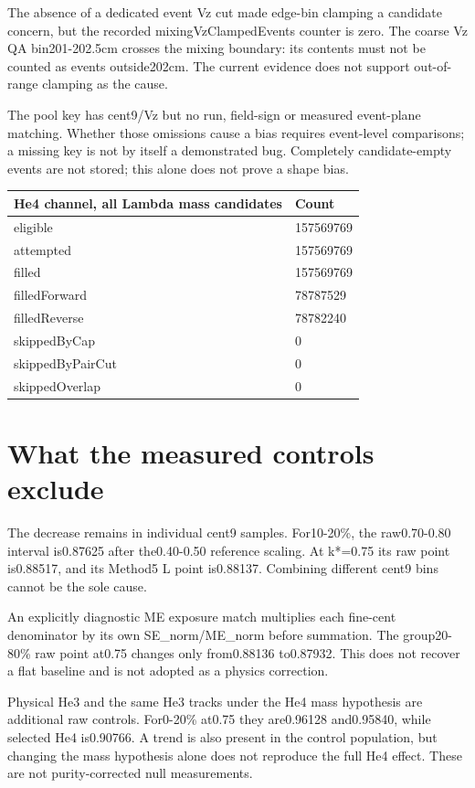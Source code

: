 \documentclass[10pt,a4paper]{article}
\begin{document}
The absence of a dedicated event Vz cut made edge-bin clamping a candidate concern, but the recorded mixingVzClampedEvents counter is zero. The coarse Vz QA bin201-202.5cm crosses the mixing boundary: its contents must not be counted as events outside202cm. The current evidence does not support out-of-range clamping as the cause.

The pool key has cent9/Vz but no run, field-sign or measured event-plane matching. Whether those omissions cause a bias requires event-level comparisons; a missing key is not by itself a demonstrated bug. Completely candidate-empty events are not stored; this alone does not prove a shape bias.

{\small\setlength{\tabcolsep}{3pt}\begin{longtable}{ll}\toprule
He4 channel, all Lambda mass candidates & Count\\\midrule\endhead
eligible & 157569769\\
attempted & 157569769\\
filled & 157569769\\
filledForward & 78787529\\
filledReverse & 78782240\\
skippedByCap & 0\\
skippedByPairCut & 0\\
skippedOverlap & 0\\
\bottomrule\end{longtable}}
\clearpage
\section*{What the measured controls exclude}
The decrease remains in individual cent9 samples. For10-20\%, the raw0.70-0.80 interval is0.87625 after the0.40-0.50 reference scaling. At k*=0.75 its raw point is0.88517, and its Method5 L point is0.88137. Combining different cent9 bins cannot be the sole cause.

An explicitly diagnostic ME exposure match multiplies each fine-cent denominator by its own SE\_norm/ME\_norm before summation. The group20-80\% raw point at0.75 changes only from0.88136 to0.87932. This does not recover a flat baseline and is not adopted as a physics correction.

Physical He3 and the same He3 tracks under the He4 mass hypothesis are additional raw controls. For0-20\% at0.75 they are0.96128 and0.95840, while selected He4 is0.90766. A trend is also present in the control population, but changing the mass hypothesis alone does not reproduce the full He4 effect. These are not purity-corrected null measurements.
\end{document}

